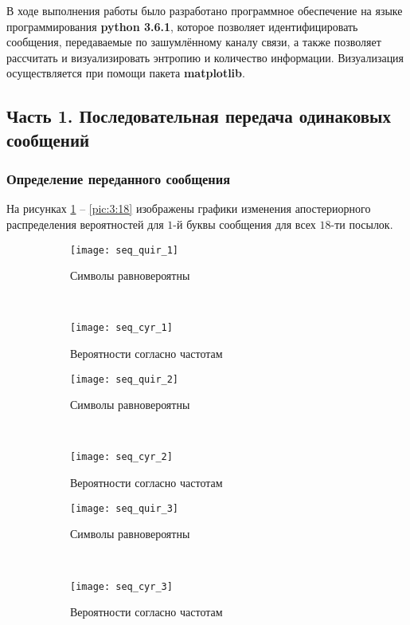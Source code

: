 В ходе выполнения работы было разработано программное обеспечение на языке программирования \textbf{python 3.6.1}, которое позволяет идентифицировать сообщения, передаваемые по зашумлённому каналу связи, а также позволяет рассчитать и визуализировать энтропию и количество информации. Визуализация осуществляется при помощи пакета \textbf{matplotlib}.

\subsection{Часть 1. Последовательная передача одинаковых сообщений}

\subsubsection{Определение переданного сообщения}

На рисунках \ref{pic:3:1} -- \ref{pic:3:18} изображены графики изменения апостериорного распределения вероятностей для $1$-й буквы сообщения для всех $18$-ти посылок.

\begin{figure}[H]
\begin{center}
	\begin{subfigure}[b]{0.45\textwidth}
		\texttt{[image: seq\_quir\_1]}
		\caption{Символы равновероятны}
	\end{subfigure}
	~
	\begin{subfigure}[b]{0.45\textwidth}
		\texttt{[image: seq\_cyr\_1]}
		\caption{Вероятности согласно частотам}
	\end{subfigure}
	\caption{}
	\label{pic:3:1}
\end{center}
\end{figure}

\begin{figure}[H]
\begin{center}
	\begin{subfigure}[b]{0.45\textwidth}
		\texttt{[image: seq\_quir\_2]}
		\caption{Символы равновероятны}
	\end{subfigure}
	~
	\begin{subfigure}[b]{0.45\textwidth}
		\texttt{[image: seq\_cyr\_2]}
		\caption{Вероятности согласно частотам}
	\end{subfigure}
	\caption{}
\end{center}
\end{figure}

\begin{figure}[H]
\begin{center}
	\begin{subfigure}[b]{0.45\textwidth}
		\texttt{[image: seq\_quir\_3]}
		\caption{Символы равновероятны}
	\end{subfigure}
	~
	\begin{subfigure}[b]{0.45\textwidth}
		\texttt{[image: seq\_cyr\_3]}
		\caption{Вероятности согласно частотам}
	\end{subfigure}
	\caption{}
\end{center}
\end{figure}


